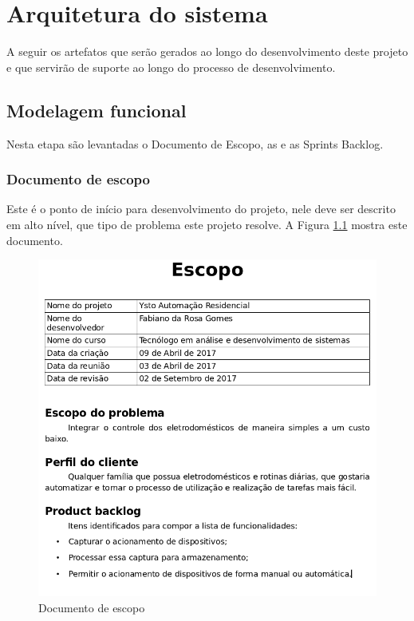 \chapter{Arquitetura do sistema}

A seguir os artefatos que serão gerados ao longo do desenvolvimento deste projeto e que servirão de suporte ao longo do processo de desenvolvimento.

\section{Modelagem funcional}
Nesta etapa são levantadas o Documento de Escopo, as e as Sprints Backlog.

\subsection{Documento de escopo}
Este é o ponto de início para desenvolvimento do projeto, nele deve ser descrito em alto nível, que tipo de problema este projeto resolve. A Figura \ref{doc-escopo} mostra este documento.

\begin{figure}[H]
\caption{\label{doc-escopo} Documento de escopo}
\includegraphics[scale=0.33]{img/escopo.png}
\end{figure}

